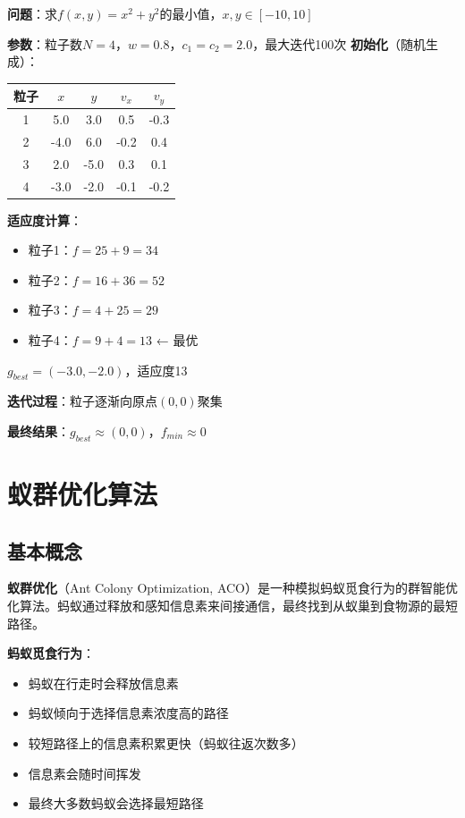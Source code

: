 \begin{examplebox}[例题4.4 PSO求解二维函数优化]
\textbf{问题}：求$f(x,y) = x^2 + y^2$的最小值，$x,y \in [-10, 10]$

\textbf{参数}：粒子数$N=4$，$w=0.8$，$c_1=c_2=2.0$，最大迭代100次
\tcblower
\textbf{初始化}（随机生成）：
\begin{center}
\begin{tabular}{ccccc}
\toprule
粒子 & $x$ & $y$ & $v_x$ & $v_y$ \\
\midrule
1 & 5.0 & 3.0 & 0.5 & -0.3 \\
2 & -4.0 & 6.0 & -0.2 & 0.4 \\
3 & 2.0 & -5.0 & 0.3 & 0.1 \\
4 & -3.0 & -2.0 & -0.1 & -0.2 \\
\bottomrule
\end{tabular}
\end{center}

\textbf{适应度计算}：
\begin{itemize}[itemsep=0pt]
    \item 粒子1：$f = 25 + 9 = 34$
    \item 粒子2：$f = 16 + 36 = 52$
    \item 粒子3：$f = 4 + 25 = 29$
    \item 粒子4：$f = 9 + 4 = 13$ ← 最优
\end{itemize}

$g_{best} = (-3.0, -2.0)$，适应度13

\textbf{迭代过程}：粒子逐渐向原点$(0,0)$聚集

\textbf{最终结果}：$g_{best} \approx (0, 0)$，$f_{min} \approx 0$
\end{examplebox}


\section{蚁群优化算法}

\subsection{基本概念}

\begin{conceptbox}
\textbf{蚁群优化}（Ant Colony Optimization, ACO）是一种模拟蚂蚁觅食行为的群智能优化算法。蚂蚁通过释放和感知信息素来间接通信，最终找到从蚁巢到食物源的最短路径。
\end{conceptbox}

\textbf{蚂蚁觅食行为}：
\begin{itemize}[leftmargin=2em,itemsep=0pt]
    \item 蚂蚁在行走时会释放信息素
    \item 蚂蚁倾向于选择信息素浓度高的路径
    \item 较短路径上的信息素积累更快（蚂蚁往返次数多）
    \item 信息素会随时间挥发
    \item 最终大多数蚂蚁会选择最短路径
\end{itemize}

